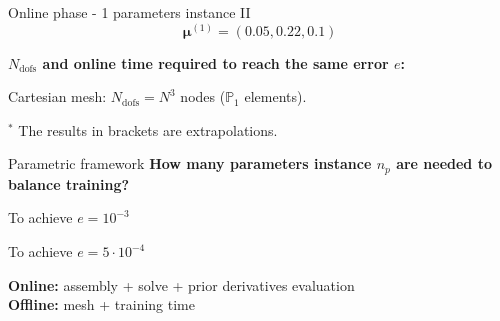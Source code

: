 \begin{frame}{Online phase - 1 parameters instance II}
	\vspace{-12pt}
	$$\bm{\mu}^{(1)}=(0.05, 0.22, 0.1) $$

	\textbf{$N_\text{dofs}$ and online time required to reach the same error $e$:}

	\begin{table}[ht!]
		\centering
	\end{table}
	\hspace{240pt}

	\begin{minipage}[t]{0.6\linewidth}
		Cartesian mesh: $N_\text{dofs} = N^3$ nodes ($\mathbb{P}_1$ elements).

		\vspace{10pt}
		\footnotesize
		$^*$ The results in brackets are extrapolations.
	\end{minipage} \hfill \begin{minipage}[t]{0.35\linewidth}
		\centering

		\vspace{15pt}
		\Large
	\end{minipage}
\end{frame}

\begin{frame}{Parametric framework}
	\setlength{\plotwidth}{0.38\textwidth}\setlength{\plotheight}{0.27\textwidth}
	\textbf{How many parameters instance $n_p$ are needed to balance training?}

	\vspace{-5pt}
	\begin{minipage}[t]{0.48\linewidth}
		\centering

		\vspace{-4pt}
		To achieve $e=10^{-3}$
	\end{minipage} \hfill
	\begin{minipage}[t]{0.48\linewidth}
		\centering

		\vspace{-4pt}
		To achieve $e=5\cdot 10^{-4}$
	\end{minipage}

	\vspace{10pt}
	\textbf{Online:} assembly + solve \textcolor{addcolor}{\; + prior derivatives evaluation} \\

	\textbf{Offline:} mesh	\textcolor{addcolor}{\; + training time}
\end{frame}
